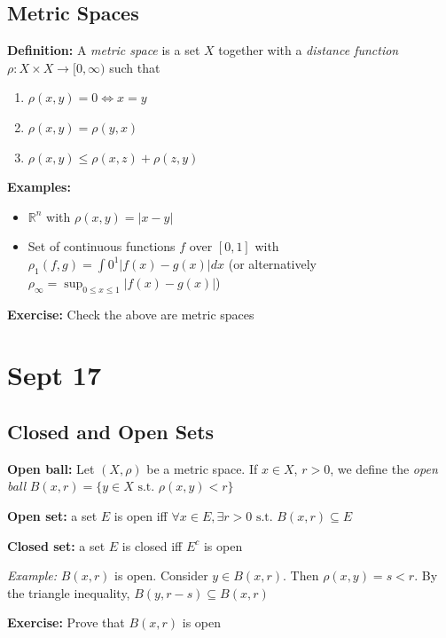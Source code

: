 \documentclass[12pt]{report}
\newcommand{\R}{\mathbb{R}}
\newcommand{\abs}[1]{\left\vert #1 \right\vert}
\newcommand{\sub}{\subseteq}
\newcommand{\st}{\text{ s.t. }}
\newenvironment*{exercise}[1][red]{
    \begin{tcolorbox}[
        parbox=false,
        colback=#1!5!white,
        colframe=#1!75!black,
        breakable
    ]}
    {\end{tcolorbox}}
\begin{document}
    \subsection*{Metric Spaces}
    \textbf{Definition:} A \emph{metric space} is a set $X$ together with a \emph{distance function} $\rho: X \times X \to [0, \infty)$ such that 
    \begin{enumerate}
        \item $\rho(x, y) = 0 \iff x = y$
        \item $\rho(x, y) = \rho(y, x)$
        \item $\rho(x, y) \leq \rho(x, z) + \rho(z, y)$
    \end{enumerate}

    \textbf{Examples:} 
    \begin{itemize}
        \item $\R^n$ with $\rho(x, y) = \abs{x - y}$
        \item Set of continuous functions $f$ over $[0, 1]$ with $\rho_1(f, g) = \int0^1 \abs{f(x) - g(x)} dx$ (or alternatively $\rho_{\infty} = \sup_{0 \leq x \leq 1} \abs{f(x) - g(x)}$)
    \end{itemize}
 
    \begin{exercise}
        \textbf{Exercise:} Check the above are metric spaces
    \end{exercise}

\section{Sept 17}
\subsection*{Closed and Open Sets}  
    \textbf{Open ball:} Let $(X, \rho)$ be a metric space. If $x \in X$, $r > 0$, we define the \emph{open ball} $B(x, r) = \{y \in X \st \rho(x, y) < r\}$

    \textbf{Open set:} a set $E$ is open iff $\forall x \in E, \exists r > 0 \st B(x, r) \sub E$

    \textbf{Closed set:} a set $E$ is closed iff $E^c$ is open

    \emph{Example:} $B(x, r)$ is open. Consider $y \in B(x, r)$. Then $\rho(x, y) = s < r$. By the triangle inequality, $B(y, r - s) \sub B(x, r)$ 

    \begin{exercise}
        \textbf{Exercise:} Prove that $B(x, r)$ is open
    \end{exercise}
\end{document}
